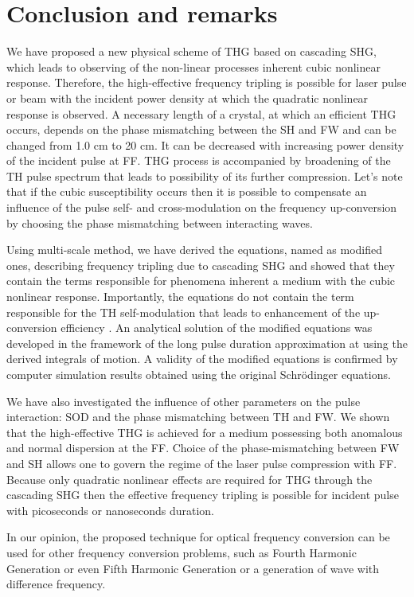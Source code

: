 \documentclass[a4paper, 12pt, onecolumn]{extarticle}
\begin{document}
\section*{Conclusion and remarks}

We have proposed a new physical scheme of THG based on cascading SHG, which leads to observing of the non-linear processes inherent  cubic nonlinear response. Therefore, the high-effective frequency tripling is possible for laser pulse or beam with the incident power density at which  the quadratic nonlinear response is observed.   A necessary length of a crystal, at which an efficient THG occurs, depends on the phase mismatching between the SH and FW and can be changed from 1.0 cm to 20 cm. It can be decreased with increasing power density of the incident pulse at FF.  THG process is accompanied by broadening  of the TH pulse spectrum that leads to possibility of  its further  compression.
Let's note that if the cubic susceptibility occurs then it is possible to compensate an influence of the pulse self- and cross-modulation on the frequency up-conversion by choosing the phase mismatching between interacting waves.


Using multi-scale method, we have derived the equations, named as  modified ones, describing frequency tripling due to cascading SHG and showed that they contain the terms responsible for phenomena inherent a medium with the cubic nonlinear response. Importantly, the equations do not contain the term responsible for the TH self-modulation that leads to enhancement of the up-conversion efficiency .  An analytical solution of the modified equations was developed in the framework of the long pulse duration approximation at using the derived integrals of motion. A validity of the modified equations is confirmed by computer simulation results obtained using the original Schr\"{o}dinger equations.

We have also investigated the influence of other parameters on the pulse interaction: SOD and the phase mismatching between TH and FW.  We shown that the high-effective  THG  is achieved for a medium possessing both anomalous and normal dispersion at the FF. Choice of the phase-mismatching between   FW and SH allows one to govern the regime of the laser pulse compression with FF. Because only quadratic nonlinear effects are required for THG through the cascading SHG then the effective frequency tripling  is possible for incident pulse with  picoseconds or nanoseconds duration.  

In our opinion, the proposed technique for optical frequency conversion can be used for other frequency conversion problems, such as Fourth Harmonic Generation or even Fifth Harmonic Generation or  a generation of wave with difference frequency.
\end{document}

